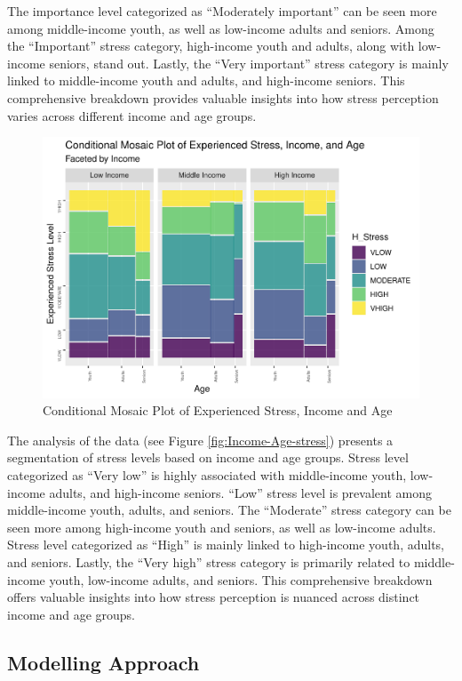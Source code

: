 \documentclass[
11pt, %
oneside, %
english, %
singlespacing, %
]{macthesis} %
\begin{document}
The importance level categorized as ``Moderately important'' can be seen more among middle-income youth, as well as low-income adults and seniors. Among the ``Important'' stress category, high-income youth and adults, along with low-income seniors, stand out. Lastly, the ``Very important'' stress category is mainly linked to middle-income youth and adults, and high-income seniors. This comprehensive breakdown provides valuable insights into how stress perception varies across different income and age groups.
\begin{figure}
\includegraphics[width=0.85\linewidth]{thesis_files/figure-latex/unnamed-chunk-35-1} \caption{\label{fig:Income-Age-stress}Conditional Mosaic Plot of Experienced Stress, Income and Age}\label{fig:unnamed-chunk-35}
\end{figure}
The analysis of the data (see Figure \ref{fig:Income-Age-stress}) presents a segmentation of stress levels based on income and age groups. Stress level categorized as ``Very low'' is highly associated with middle-income youth, low-income adults, and high-income seniors. ``Low'' stress level is prevalent among middle-income youth, adults, and seniors. The ``Moderate'' stress category can be seen more among high-income youth and seniors, as well as low-income adults. Stress level categorized as ``High'' is mainly linked to high-income youth, adults, and seniors. Lastly, the ``Very high'' stress category is primarily related to middle-income youth, low-income adults, and seniors. This comprehensive breakdown offers valuable insights into how stress perception is nuanced across distinct income and age groups.

\hypertarget{modelling-approach}{%
\subsection{Modelling Approach}\label{modelling-approach}}
\end{document}
